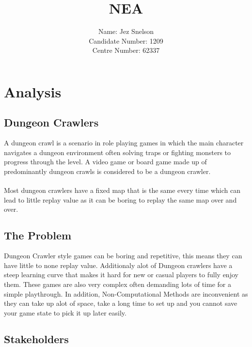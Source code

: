 \documentclass{article}
\title{\textbf{NEA}}
\author{Name: Jez Snelson\\
        Candidate Number: 1209\\
        Centre Number: 62337}
\begin{document}
\date{}
\pagestyle{empty}
\maketitle
\newpage
\tableofcontents
\newpage
\pagestyle{fancy}
\section{Analysis}
        \subsection{Dungeon Crawlers}
        A dungeon crawl is a scenario in role playing games in which the main character navigates a dungeon environment often solving traps or fighting monsters to progress through the level. A video game or board game made up of predominantly dungeon crawls is considered to be a dungeon crawler.\\
        \\
        Most dungeon crawlers have a fixed map that is the same every time which can lead to little replay value as it can be boring to replay the same map over and over.\\
        \subsection{The Problem}
        Dungeon Crawler style games can be boring and repetitive, this means they can have little to none replay value. Additionaly alot of Dungeon crawlers have a steep learning curve that makes it hard for new or casual players to fully enjoy them. These games are also very complex often demanding lots of time for a simple playthrough. In addition, Non-Computational Methods are inconvenient as they can take up alot of space, take a long time to set up and you cannot save your game state to pick it up later easily.\\
        \subsection{Stakeholders}
\end{document}
